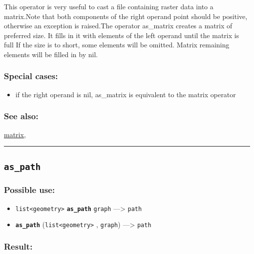 \documentclass[]{book}
\providecommand{\tightlist}{%
  \setlength{\itemsep}{0pt}\setlength{\parskip}{0pt}}
\theoremstyle{definition}
\theoremstyle{definition}
\theoremstyle{definition}
\theoremstyle{remark}
\begin{document}
This operator is very useful to cast a file containing raster data into
a matrix.Note that both components of the right operand point should be
positive, otherwise an exception is raised.The operator as\_matrix
creates a matrix of preferred size. It fills in it with elements of the
left operand until the matrix is full If the size is to short, some
elements will be omitted. Matrix remaining elements will be filled in by
nil.

\subsubsection{Special cases:}\label{special-cases-21}

\begin{itemize}
\tightlist
\item
  if the right operand is nil, as\_matrix is equivalent to the matrix
  operator
\end{itemize}

\subsubsection{See also:}\label{see-also-37}

\href{OperatorsIM\#matrix}{matrix},

\begin{center}\rule{0.5\linewidth}{\linethickness}\end{center}

\subsection{\texorpdfstring{\texttt{as\_path}}{as\_path}}\label{as_path}

\subsubsection{Possible use:}\label{possible-use-54}

\begin{itemize}
\tightlist
\item
  \texttt{list\textless{}geometry\textgreater{}}
  \textbf{\texttt{as\_path}} \texttt{graph} ---\textgreater{}
  \texttt{path}
\item
  \textbf{\texttt{as\_path}}
  (\texttt{list\textless{}geometry\textgreater{}} , \texttt{graph})
  ---\textgreater{} \texttt{path}
\end{itemize}

\subsubsection{Result:}\label{result-53}
\end{document}
